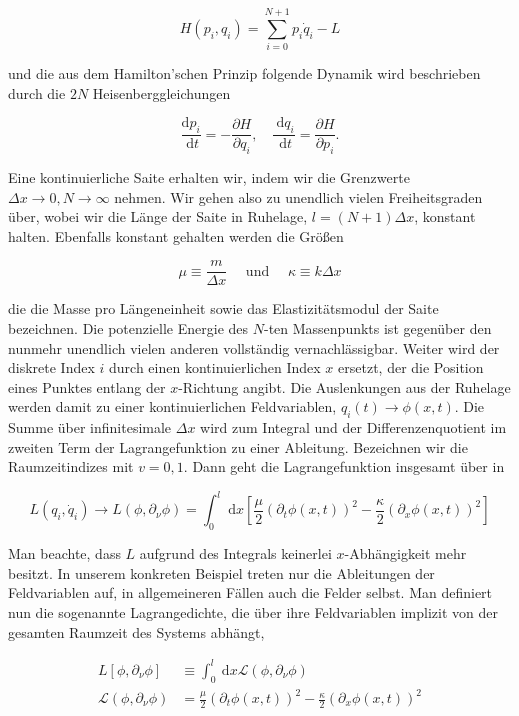 \documentclass[10pt, letterpaper]{article}
\begin{document}
$$
H\left(p_{i}, q_{i}\right)=\sum_{i=0}^{N+1} p_{i} \dot{q}_{i}-L
$$

und die aus dem Hamilton'schen Prinzip folgende Dynamik wird beschrieben durch die $2 N$ Heisenberggleichungen

$$
\frac{\mathrm{d} p_{i}}{\mathrm{~d} t}=-\frac{\partial H}{\partial q_{i}}, \quad \frac{\mathrm{~d} q_{i}}{\mathrm{~d} t}=\frac{\partial H}{\partial p_{i}} .
$$

Eine kontinuierliche Saite erhalten wir, indem wir die Grenzwerte $\Delta x \rightarrow 0, N \rightarrow \infty$ nehmen. Wir gehen also zu unendlich vielen Freiheitsgraden über, wobei wir die Länge der Saite in Ruhelage, $l=(N+1) \Delta x$, konstant halten. Ebenfalls konstant gehalten werden die Größen

$$
\mu \equiv \frac{m}{\Delta x} \quad \text { und } \quad \kappa \equiv k \Delta x
$$

die die Masse pro Längeneinheit sowie das Elastizitätsmodul der Saite bezeichnen. Die potenzielle Energie des $N$-ten Massenpunkts ist gegenüber den nunmehr unendlich vielen anderen vollständig vernachlässigbar. Weiter wird der diskrete Index $i$ durch einen kontinuierlichen Index $x$ ersetzt, der die Position eines Punktes entlang der $x$-Richtung angibt. Die Auslenkungen aus der Ruhelage werden damit zu einer kontinuierlichen Feldvariablen, $q_{i}(t) \rightarrow \phi(x, t)$. Die Summe über infinitesimale $\Delta x$ wird zum Integral und der Differenzenquotient im zweiten Term der Lagrangefunktion zu einer Ableitung. Bezeichnen wir die Raumzeitindizes mit $v=0,1$. Dann geht die Lagrangefunktion insgesamt über in

$$
L\left(q_{i}, \dot{q}_{i}\right) \rightarrow L\left(\phi, \partial_{\nu} \phi\right)=\int_{0}^{l} \mathrm{~d} x\left[\frac{\mu}{2}\left(\partial_{t} \phi(x, t)\right)^{2}-\frac{\kappa}{2}\left(\partial_{x} \phi(x, t)\right)^{2}\right]
$$

Man beachte, dass $L$ aufgrund des Integrals keinerlei $x$-Abhängigkeit mehr besitzt. In unserem konkreten Beispiel treten nur die Ableitungen der Feldvariablen auf, in allgemeineren Fällen auch die Felder selbst. Man definiert nun die sogenannte Lagrangedichte, die über ihre Feldvariablen implizit von der gesamten Raumzeit des Systems abhängt,

$$
\begin{aligned}
L\left[\phi, \partial_{\nu} \phi\right] & \equiv \int_{0}^{l} \mathrm{~d} x \mathscr{L}\left(\phi, \partial_{\nu} \phi\right) \\
\mathscr{L}\left(\phi, \partial_{\nu} \phi\right) & =\frac{\mu}{2}\left(\partial_{t} \phi(x, t)\right)^{2}-\frac{\kappa}{2}\left(\partial_{x} \phi(x, t)\right)^{2}
\end{aligned}
$$
\end{document}
